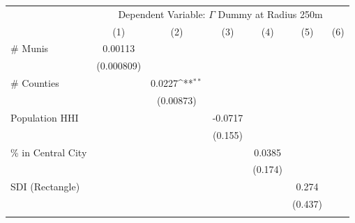 {
\def\sym#1{\ifmmode^{#1}\else\(^{#1}\)\fi}
\begin{tabular}{l*{6}{c}}
\toprule
                    &\multicolumn{6}{c}{Dependent Variable: \(\Gamma\) Dummy at Radius 250m}                                                            \\
                    &\multicolumn{1}{c}{(1)}         &\multicolumn{1}{c}{(2)}         &\multicolumn{1}{c}{(3)}         &\multicolumn{1}{c}{(4)}         &\multicolumn{1}{c}{(5)}         &\multicolumn{1}{c}{(6)}         \\
\midrule
\# Munis            &     0.00113         &                     &                     &                     &                     &                     \\
                    &  (0.000809)         &                     &                     &                     &                     &                     \\
\addlinespace
\# Counties         &                     &      0.0227\sym{**} &                     &                     &                     &                     \\
                    &                     &   (0.00873)         &                     &                     &                     &                     \\
\addlinespace
Population HHI      &                     &                     &     -0.0717         &                     &                     &                     \\
                    &                     &                     &     (0.155)         &                     &                     &                     \\
\addlinespace
\% in Central City  &                     &                     &                     &      0.0385         &                     &                     \\
                    &                     &                     &                     &     (0.174)         &                     &                     \\
\addlinespace
SDI (Rectangle)     &                     &                     &                     &                     &       0.274         &                     \\
                    &                     &                     &                     &                     &     (0.437)         &                     \\
\addlinespace

\end{tabular}}
